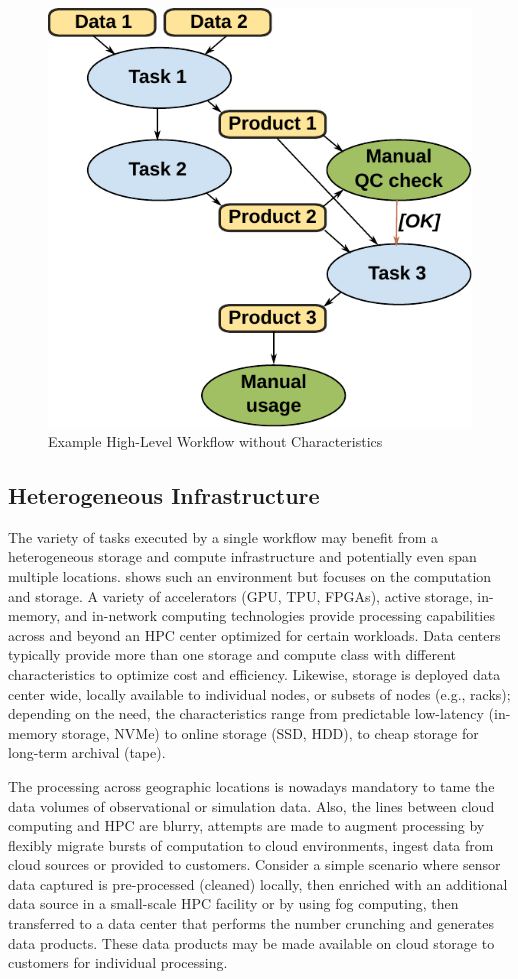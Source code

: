 \documentclass[a4paper, twocolumn]{article}
\begin{document}
\begin{figure}[b]
  \centering
  \includegraphics[width=0.75\columnwidth]{workflow}
  \caption{Example High-Level Workflow without Characteristics}
  \label{fig:workflow}
\end{figure}


\subsection{Heterogeneous Infrastructure}

The variety of tasks executed by a single workflow may benefit from a heterogeneous storage and compute infrastructure and potentially even span multiple locations.
 shows such an environment but focuses on the computation and storage.
A variety of accelerators (GPU, TPU, FPGAs), active storage, in-memory, and in-network computing technologies provide processing capabilities across and beyond an HPC center optimized for certain workloads.
Data centers typically provide more than one storage and compute class with different characteristics to optimize cost and efficiency.
Likewise, storage is deployed data center wide, locally available to individual nodes, or subsets of nodes (e.g., racks); depending on the need, the characteristics range from predictable low-latency (in-memory storage, NVMe) to online storage (SSD, HDD), to cheap storage for long-term archival (tape).

The processing across geographic locations is nowadays mandatory to tame the data volumes of observational or simulation data.
Also, the lines between cloud computing and HPC are blurry, attempts are made to augment processing by flexibly migrate bursts of computation to cloud environments, ingest data from cloud sources or provided to customers.
Consider a simple scenario where sensor data captured is pre-processed (cleaned) locally, then enriched with an additional data source in a small-scale HPC facility or by using fog computing, then transferred to a data center that performs the number crunching and generates data products.
These data products may be made available on cloud storage to customers for individual processing.
\end{document}
